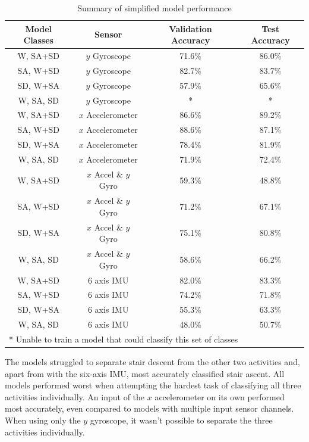 \documentclass[sensors,article,submit,moreauthors,pdftex]{Definitions/mdpi}
\begin{document}
\begin{table}[!hbt]
    \centering
    \caption{Summary of simplified model performance}
    \label{tab:simplified_model_perfomances}
    \begin{tabular}{cccc}
        \textbf{Model Classes} & \textbf{Sensor} & \textbf{Validation Accuracy} & \textbf{Test Accuracy}\\
        \hline
        W, SA+SD & $y$ Gyroscope & 71.6\% & 86.0\% \\
        SA, W+SD & $y$ Gyroscope & 82.7\% & 83.7\% \\
        SD, W+SA & $y$ Gyroscope & 57.9\% & 65.6\% \\
        W, SA, SD & $y$ Gyroscope & * & * \\
        W, SA+SD & $x$ Accelerometer & 86.6\% & 89.2\% \\
        SA, W+SD & $x$ Accelerometer & 88.6\% & 87.1\% \\
        SD, W+SA & $x$ Accelerometer & 78.4\% & 81.9\% \\
        W, SA, SD & $x$ Accelerometer & 71.9\% & 72.4\%\\
        W, SA+SD & $x$ Accel \& $y$ Gyro & 59.3\% & 48.8\% \\
        SA, W+SD & $x$ Accel \& $y$ Gyro & 71.2\% & 67.1\% \\
        SD, W+SA & $x$ Accel \& $y$ Gyro & 75.1\% & 80.8\% \\
        W, SA, SD & $x$ Accel \& $y$ Gyro & 58.6\% & 66.2\%\\
        W, SA+SD & 6 axis IMU & 82.0\% & 83.3\% \\
        SA, W+SD & 6 axis IMU & 74.2\% & 71.8\% \\
        SD, W+SA & 6 axis IMU & 55.3\% & 63.3\% \\
        W, SA, SD & 6 axis IMU & 48.0\% & 50.7\%\\
        \multicolumn{4}{l}{\footnotesize{* Unable to train a model that could classify this set of classes}}
    \end{tabular}
\end{table}

The models struggled to separate stair descent from the other two activities and, apart from with the six-axis IMU, most accurately classified stair ascent. All models performed worst when attempting the hardest task of classifying all three activities individually. An input of the $x$ accelerometer on its own performed most accurately, even compared to models with multiple input sensor channels. When using only the $y$ gyroscope, it wasn't possible to separate the three activities individually.
\end{document}
